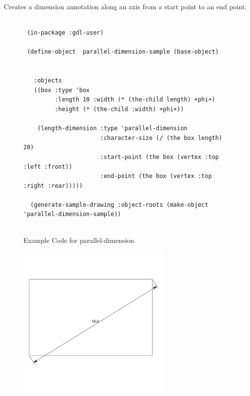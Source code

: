 \documentclass [11pt]{book}
\begin{document}
\begin{itemize}
\begin{description}
Creates a dimension annotation along an axis from a start point to an end point.



\end{description}




\begin{figure}
\begin{lrbox}{\boxedverb}
\begin{minipage}{\linewidth}
{\small

\begin{verbatim}        

 (in-package :gdl-user)
                   
 (define-object  parallel-dimension-sample (base-object)
  
  
   :objects
   ((box :type 'box
         :length 10 :width (* (the-child length) +phi+)
         :height (* (the-child :width) +phi+))
   
    (length-dimension :type 'parallel-dimension
                      :character-size (/ (the box length) 20)
                      :start-point (the box (vertex :top :left :front))
                      :end-point (the box (vertex :top :right :rear)))))

  (generate-sample-drawing :object-roots (make-object 'parallel-dimension-sample))


\end{verbatim}}
\end{minipage}
\end{lrbox}
\fbox{\usebox{\boxedverb}}

\caption{Example Code for parallel-dimension}

\label{fig:example-code-parallel-dimension}

\end{figure}

\begin{figure}
\begin{center}
\includegraphics[width=3in,height=3in]{../images/example-parallel-dimension.pdf}
\end{center}


\end{figure}
\end{itemize}
\end{document}

